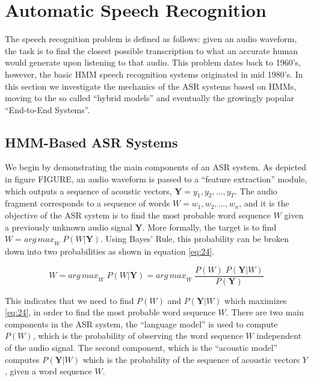 \section{Automatic Speech Recognition} 
\label{bg:s3}

The speech recognition problem is defined as follows: given an audio waveform, the task is to find the closest possible transcription to what an accurate human would generate upon listening to that audio. This problem dates back to 1960's, however, the basic \ac{HMM} speech recognition systems originated in mid 1980's. In this section we investigate the mechanics of the \ac{ASR} systems based on \ac{HMM}s, moving to the so called \enquote{hybrid models} and eventually the growingly popular \enquote{End-to-End Systems}.

\subsection{HMM-Based ASR Systems} 
\label{bg:s3_sub1}



We begin by demonstrating the main components of an \ac{ASR} system. As depicted in figure FIGURE, an audio waveform is passed to a \enquote{feature extraction} module, which outputs a sequence of acoustic vectors, $\mathbf{Y} = y_1,y_2,...,y_T$. The audio fragment corresponds to a sequence of words $W = w_1,w_2,...,w_n$, and it is the objective of the \ac{ASR} system is to find the most probable word sequence $W$ given a previously unknown audio signal $\mathbf{Y}$.
More formally, the target is to find $W = {arg \, max}_{W} \; P(W|\mathbf{Y})$. Using Bayes' Rule, this probability can be broken down into two probabilities as shown in equation \ref{eq:24}.


\begin{equation}
\label{eq:24}
W = {arg \, max}_{W} \; P(W|\mathbf{Y}) = {arg \, max}_{W} \; \frac{P(W) \; P(\mathbf{Y}|W)}{P(\mathbf{Y})}
\end{equation}

This indicates that we need to find $P(W)$ and $P(\mathbf{Y}|W)$ which maximizes \ref{eq:24}, in order to find the most probable word sequence $W$.
There are two main components in the \ac{ASR} system, the \enquote{language model} is used to compute $P(W)$, which is the probability of observing the word sequence $W$ independent of the audio signal. The second component, which is the \enquote{acoustic model} computes $P(\mathbf{Y}|W)$ which is the probability of the sequence of acoustic vectors $Y$, given a word sequence $W$.

